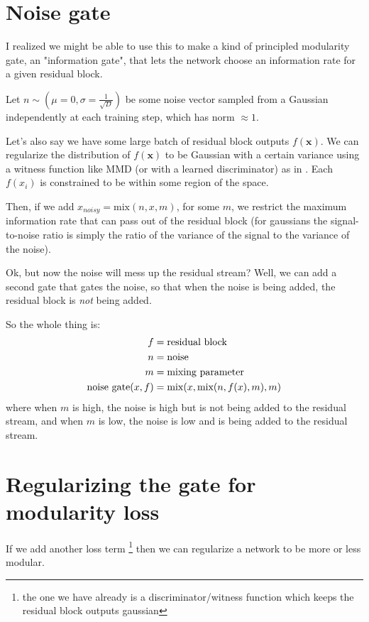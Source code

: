 \documentclass{article}
\begin{document}
\section{Noise gate}

I realized we might be able to use this to make a kind of principled modularity gate, an "information gate", that lets the network choose an information rate for a given residual block.

Let $n \sim (\mu = 0, \sigma = \frac{1}{\sqrt{D}})$ be some noise vector sampled from a Gaussian independently at each training step, which has norm $\approx 1$.

Let's also say we have some large batch of residual block outputs $f(\mathbf{x})$. We can regularize the distribution of $f(\mathbf{x})$ to be Gaussian with a certain variance using a witness function like MMD (or with a learned discriminator) as in \cite{bir-vae}. Each $f(x_i)$ is constrained to be within some region of the space.

Then, if we add $x_{noisy} = \text{mix}(n, x, m)$, for some $m$, we restrict the maximum information rate that can pass out of the residual block (for gaussians the signal-to-noise ratio is simply the ratio of the variance of the signal to the variance of the noise).

Ok, but now the noise will mess up the residual stream? Well, we can add a second gate that gates the noise, so that when the noise is being added, the residual block is \textit{not} being added.

So the whole thing is:
\begin{align*}
    f &= \text{residual block} \\
    n &= \text{noise} \\
    m &= \text{mixing parameter} \\
    \text{noise gate}(x, f) &= \text{mix}(x, \text{\text{mix}}(n, f(x), m), m)
\end{align*}
where when $m$ is high, the noise is high but is not being added to the residual stream, and when $m$ is low, the noise is low and is being added to the residual stream.

\section{Regularizing the gate for modularity loss}

If we add another loss term \footnote{the one we have already is a discriminator/witness function which keeps the residual block outputs gaussian} then we can regularize a network to be more or less modular.
\end{document}
